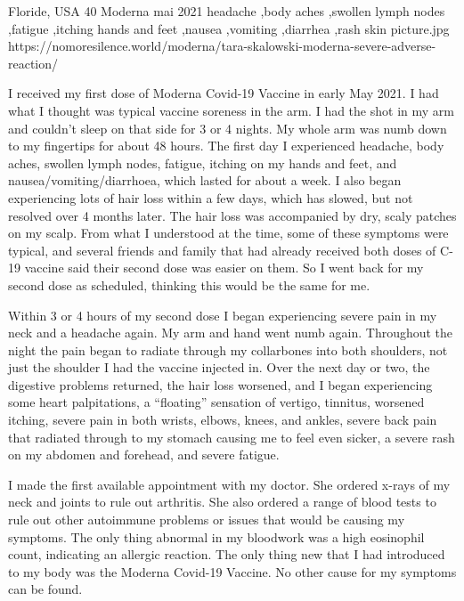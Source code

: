           {Floride, USA}
          {40}
          {Moderna}
          {mai 2021}
          {headache
            ,body aches
            ,swollen lymph nodes
            ,fatigue
            ,itching hands and feet
            ,nausea
            ,vomiting
            ,diarrhea
            ,rash skin
          }
          {picture.jpg}
          {https://nomoresilence.world/moderna/tara-skalowski-moderna-severe-adverse-reaction/}
          {

\normalsize

I received my first dose of Moderna Covid-19 Vaccine in early May 2021. I had
what I thought was typical vaccine soreness in the arm. I had the shot in my arm
and couldn’t sleep on that side for 3 or 4 nights. My whole arm was numb down to
my fingertips for about 48 hours. The first day I experienced headache, body
aches, swollen lymph nodes, fatigue, itching on my hands and feet, and
nausea/vomiting/diarrhoea, which lasted for about a week. I also began
experiencing lots of hair loss within a few days, which has slowed, but not
resolved over 4 months later. The hair loss was accompanied by dry, scaly
patches on my scalp. From what I understood at the time, some of these symptoms
were typical, and several friends and family that had already received both
doses of C-19 vaccine said their second dose was easier on them. So I went back
for my second dose as scheduled, thinking this would be the same for me.

Within 3 or 4 hours of my second dose I began experiencing severe pain in my
neck and a headache again. My arm and hand went numb again. Throughout the night
the pain began to radiate through my collarbones into both shoulders, not just
the shoulder I had the vaccine injected in. Over the next day or two, the
digestive problems returned, the hair loss worsened, and I began experiencing
some heart palpitations, a “floating” sensation of vertigo, tinnitus, worsened
itching, severe pain in both wrists, elbows, knees, and ankles, severe back pain
that radiated through to my stomach causing me to feel even sicker, a severe
rash on my abdomen and forehead, and severe fatigue.

I made the first available appointment with my doctor. She ordered x-rays of my
neck and joints to rule out arthritis. She also ordered a range of blood tests
to rule out other autoimmune problems or issues that would be causing my
symptoms. The only thing abnormal in my bloodwork was a high eosinophil count,
indicating an allergic reaction. The only thing new that I had introduced to my
body was the Moderna Covid-19 Vaccine. No other cause for my symptoms can be
found.

}
